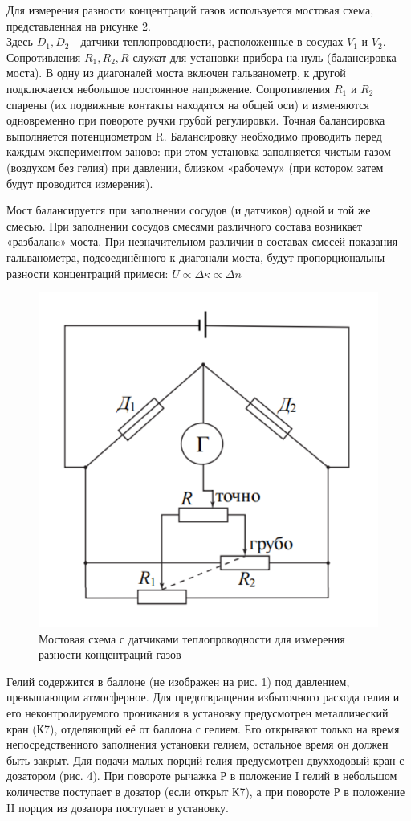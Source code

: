 \documentclass[a4paper,12pt]{article} %
\begin{document}
\item Для измерения разности концентраций газов используется мостовая схема, представленная на рисунке 2. \\
Здесь $D_1, D_2$ - датчики теплопроводности, расположенные в сосудах $V_1$ и $V_2$. Сопротивления $R_1, R_2, R$ служат для установки прибора на нуль (балансировка моста). В одну из диагоналей моста включен гальванометр, к другой подключается небольшое постоянное напряжение. Сопротивления $R_1$ и $R_2$ спарены (их подвижные контакты находятся на общей оси) и изменяются одновременно при повороте ручки грубой регулировки. Точная балансировка выполняется потенциометром R. Балансировку необходимо проводить перед каждым экспериментом заново: при этом установка заполняется чистым газом (воздухом без гелия) при давлении, близком «рабочему» (при котором затем будут проводится измерения).

 Мост балансируется при заполнении сосудов (и датчиков) одной и той же смесью. При заполнении сосудов смесями различного состава возникает «разбаланc» моста. При незначительном различии в составах смесей показания гальванометра, подсоединённого к диагонали моста, будут пропорциональны разности концентраций примеси: $U \propto \Delta \kappa \propto \Delta n$
 
\begin{figure}[H]
    \centering
    \includegraphics[width=7.5 cm]{scheme.PNG}
    \caption{Мостовая схема с датчиками теплопроводности для измерения разности концентраций газов}
    \label{fig:vac}
\end{figure} 

\item Гелий содержится в баллоне (не изображен на рис. 1) под давлением, превышающим атмосферное. Для предотвращения избыточного расхода гелия и
его неконтролируемого проникания в установку предусмотрен металлический кран (К7), отделяющий её от баллона с гелием. Его открывают только на
время непосредственного заполнения установки гелием, остальное время он должен быть закрыт. Для подачи малых порций гелия предусмотрен двухходовый кран с дозатором (рис. 4). При повороте рычажка Р в положение I гелий в небольшом количестве поступает в дозатор (если открыт К7), а при повороте Р в положение II порция из дозатора поступает в установку.
\end{document}
